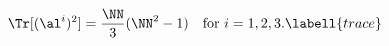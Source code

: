 \begin{equation}
\Tr[(\al^i)^2]={\NN\over3}(\NN^2-1) \quad{\rm for}\ i=1,2,3.
\labell{trace}
\end{equation}

